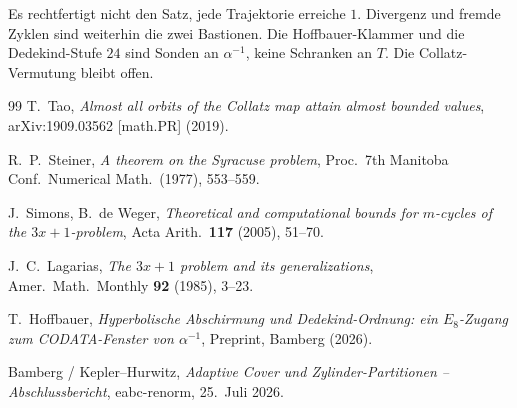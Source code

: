 \documentclass[11pt,a4paper]{article}
\theoremstyle{definition}
\theoremstyle{remark}
\numberwithin{equation}{section}
\begin{document}
Es rechtfertigt nicht den Satz, jede Trajektorie erreiche \(1\).
Divergenz und fremde Zyklen sind weiterhin die zwei Bastionen.
Die Hoffbauer-Klammer und die Dedekind-Stufe \(24\) sind Sonden an \(\alpha^{-1}\),
keine Schranken an \(T\).
Die Collatz-Vermutung bleibt offen.

\begin{thebibliography}{99}
T.~Tao,
\emph{Almost all orbits of the Collatz map attain almost bounded values},
arXiv:1909.03562 [math.PR] (2019).

R.~P.~Steiner,
\emph{A theorem on the Syracuse problem},
Proc.\ 7th Manitoba Conf.\ Numerical Math.\ (1977), 553--559.

J.~Simons, B.~de Weger,
\emph{Theoretical and computational bounds for \(m\)-cycles of the \(3x+1\)-problem},
Acta Arith.\ \textbf{117} (2005), 51--70.

J.~C.~Lagarias,
\emph{The \(3x+1\) problem and its generalizations},
Amer.\ Math.\ Monthly \textbf{92} (1985), 3--23.

T.~Hoffbauer,
\emph{Hyperbolische Abschirmung und Dedekind-Ordnung:
ein \(E_8\)-Zugang zum CODATA-Fenster von \(\alpha^{-1}\)},
Preprint, Bamberg (2026).

Bamberg / Kepler--Hurwitz,
\emph{Adaptive Cover und Zylinder-Partitionen -- Abschlussbericht},
eabc-renorm, 25.~Juli 2026.
\end{thebibliography}
\end{document}
